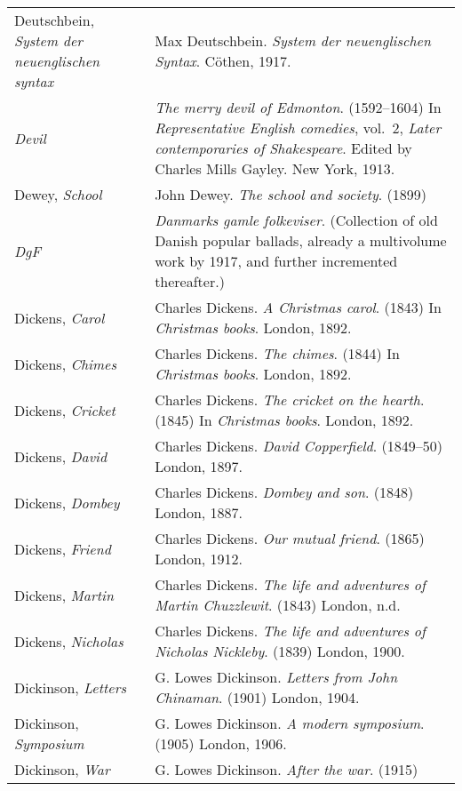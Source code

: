 \begin{longtable}{p{} p{}}
\raggedright {Deutschbein, \textit{System der neuenglischen syntax}} & Max Deutschbein. \textit{System der neuenglischen Syntax}. Cöthen, 1917. \\

\textit{Devil} & \textit{The merry devil of Edmonton}. (1592--1604) In \textit{Representative English comedies}, vol.~2, \textit{Later contemporaries of Shakespeare}. Edited by Charles Mills Gayley. New York, 1913. \\ %

Dewey, \textit{School} & John Dewey. \textit{The school and society}. (1899) \\

\textit{DgF} & \textit{Danmarks gamle folkeviser}. (Collection of old Danish popular ballads, already a multivolume work by 1917, and further incremented thereafter.) \\

Dickens, \textit{Carol} & Charles Dickens. \textit{A Christmas carol}. (1843) In \textit{Christmas books}. London, 1892. \\ %
Dickens, \textit{Chimes} & Charles Dickens. \textit{The chimes}. (1844) In \textit{Christmas books}. London, 1892. \\ %
Dickens, \textit{Cricket} & Charles Dickens. \textit{The cricket on the hearth}. (1845) In \textit{Christmas books}. London, 1892. \\
Dickens, \textit{David} & Charles Dickens. \textit{David Copperfield}. (1849--50) London, 1897. \\
Dickens, \textit{Dombey} & Charles Dickens. \textit{Dombey and son}. (1848) London, 1887. \\
Dickens, \textit{Friend} & Charles Dickens. \textit{Our mutual friend}. (1865) London, 1912. \\
Dickens, \textit{Martin} & Charles Dickens. \textit{The life and adventures of Martin Chuzzlewit}. (1843) London, n.d. \\
Dickens, \textit{Nicholas} & Charles Dickens. \textit{The life and adventures of Nicholas Nickleby}. (1839) London, 1900. \\

Dickinson, \textit{Letters} & G. Lowes Dickinson. \textit{Letters from John Chinaman}. (1901) London, 1904. \\
Dickinson, \textit{Symposium} & G. Lowes Dickinson. \textit{A modern symposium}. (1905) London, 1906. \\
Dickinson, \textit{War} & G. Lowes Dickinson. \textit{After the war}. (1915) \\


\end{longtable}
